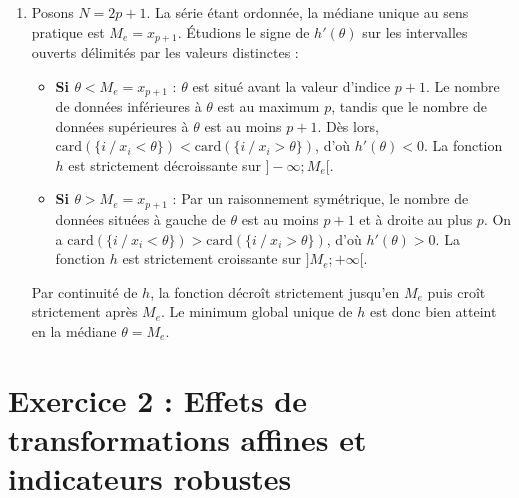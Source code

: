 \documentclass[11pt,a4paper]{article}
\begin{document}
\begin{enumerate}
\begin{enumerate}
        \item Posons $N = 2p+1$. La série étant ordonnée, la médiane unique au sens pratique est $M_e = x_{p+1}$. Étudions le signe de $h'(\theta)$ sur les intervalles ouverts délimités par les valeurs distinctes :
        \begin{itemize}
            \item \textbf{Si $\theta < M_e = x_{p+1}$} : $\theta$ est situé avant la valeur d'indice $p+1$. Le nombre de données inférieures à $\theta$ est au maximum $p$, tandis que le nombre de données supérieures à $\theta$ est au moins $p+1$. Dès lors, $\text{card}(\{i \ / \ x_i < \theta\}) < \text{card}(\{i \ / \ x_i > \theta\})$, d'où $h'(\theta) < 0$. La fonction $h$ est strictement décroissante sur $]-\infty ; M_e[$.
            \item \textbf{Si $\theta > M_e = x_{p+1}$} : Par un raisonnement symétrique, le nombre de données situées à gauche de $\theta$ est au moins $p+1$ et à droite au plus $p$. On a $\text{card}(\{i \ / \ x_i < \theta\}) > \text{card}(\{i \ / \ x_i > \theta\})$, d'où $h'(\theta) > 0$. La fonction $h$ est strictement croissante sur $]M_e ; +\infty[$.
        \end{itemize}
        Par continuité de $h$, la fonction décroît strictement jusqu'en $M_e$ puis croît strictement après $M_e$. Le minimum global unique de $h$ est donc bien atteint en la médiane $\theta = M_e$.
    \end{enumerate}
\end{enumerate}


\section*{Exercice 2 : Effets de transformations affines et indicateurs robustes}
\end{document}
